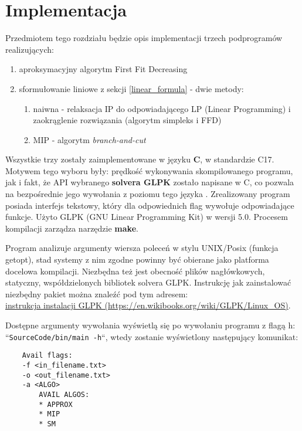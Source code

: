\chapter{Implementacja}  
\thispagestyle{chapterBeginStyle}
\label{ch:CHAPTER_3}

Przedmiotem tego rozdziału będzie opis implementacji trzech podprogramów realizujących: 
\begin{enumerate}
	\item aproksymacyjny algorytm First Fit Decreasing 
	\item sformułowanie liniowe z sekcji \ref{linear_formula} - dwie metody:
	\begin{enumerate}
		\item naiwna - relaksacja IP do odpowiadającego LP (Linear Programming) i zaokrąglenie rozwiązania (algorytm simpleks i FFD)
		\item MIP - algorytm \textit{branch-and-cut}
	\end{enumerate}
	 
\end{enumerate}

Wszystkie trzy zostały zaimplementowane w języku \textbf{C}, w standardzie C17. Motywem tego wyboru były: prędkość wykonywania skompilowanego programu, jak i fakt, że API wybranego \textbf{solvera GLPK} zostało napisane w C, co pozwala na bezpośrednie jego wywołania z poziomu tego języka \cite{GLPK_API}.
Zrealizowany program posiada interfejs tekstowy, który dla odpowiednich flag wywołuje odpowiadające funkcje. Użyto GLPK (GNU Linear Programming Kit) w wersji 5.0. 
Procesem kompilacji zarządza narzędzie \textbf{make}.


Program analizuje argumenty wiersza poleceń w stylu UNIX/Posix (funkcja getopt), stad systemy z nim zgodne powinny być obierane jako platforma docelowa kompilacji. Niezbędna też jest obecność plików nagłówkowych, statyczny, współdzielonych bibliotek solvera GLPK. Instrukcję jak zainstalować niezbędny pakiet można znaleźć pod tym adresem: \\ \href{https://en.wikibooks.org/wiki/GLPK/Linux_OS}{instrukcja instalacji GLPK (https://en.wikibooks.org/wiki/GLPK/Linux\_OS)}.

Dostępne argumenty wywołania wyświetlą się po wywołaniu programu z flagą h: ``\verb|SourceCode/bin/main -h|``, wtedy zostanie wyświetlony następujący komunikat:

\begin{lstlisting}
	Avail flags:
	-f <in_filename.txt>
	-o <out_filename.txt>
	-a <ALGO>
		AVAIL ALGOS: 
		* APPROX 
		* MIP 
		* SM 
\end{lstlisting}


